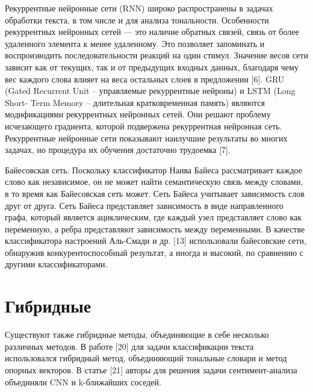 Рекуррентные нейронные сети (RNN) широко распространены в задачах обработки
текста, в том числе и для анализа тональности. Особенности рекуррентных
нейронных сетей — это наличие обратных связей, связь от более удаленного
элемента к менее удаленному. Это позволяет запоминать и воспроизводить
последовательности реакций на один стимул. Значение весов сети зависит как от
текущих, так и от предыдущих входных данных, благодаря чему вес каждого слова
влияет на веса остальных слоев в предложении [6].
GRU (Gated Recurrent Unit – управляемые рекуррентные нейроны) и LSTM (Long
Short- Term Memory – длительная кратковременная память) являются модификациями
рекуррентных нейронных сетей. Они решают проблему исчезающего градиента, которой
подвержена рекуррентная нейронная сеть.
Рекуррентные нейронные сети показывают наилучшие результаты во многих задачах,
но процедура их обучения достаточно трудоемка [7].~\cite{article9}

Байесовская сеть. Поскольку классификатор Наива Байеса рассматривает каждое
слово как независимое, он не может найти семантическую связь между словами, в то
время как Байесовская сеть может. Сеть Байеса учитывает зависимость слов друг от
друга. Сеть Байеса представляет зависимость в виде направленного графа, который
является ациклическим, где каждый узел представляет слово как переменную, а
ребра представляют зависимость между переменными. В качестве классификатора
настроений Аль-Смади и др. [13] использовали байесовские сети, обнаружив
конкурентоспособный результат, а иногда и высокий, по сравнению с другими
классификаторами.~\cite{article16}

\section{Гибридные}

Существуют также гибридные методы, объединяющие в себе несколько различных
методов.  В работе [20] для задачи классификации текста использовался гибридный
метод, объединяющий тональные словари и метод опорных векторов.  В статье [21]
авторы для решения задачи сентимент-анализа объединяли CNN и k-ближайших
соседей.~\cite{article14}

